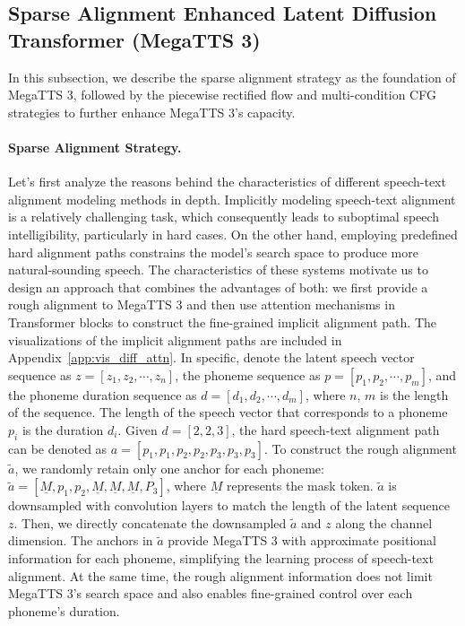 
\subsection{Sparse Alignment Enhanced Latent Diffusion Transformer (MegaTTS 3)}
\label{method:sec_3_2}
In this subsection, we describe the sparse alignment strategy as the foundation of MegaTTS 3, followed by the piecewise rectified flow and multi-condition CFG strategies to further enhance MegaTTS 3's capacity.

\paragraph{Sparse Alignment Strategy.}
Let’s first analyze the reasons behind the characteristics of different speech-text alignment modeling methods in depth. Implicitly modeling speech-text alignment is a relatively challenging task, which consequently leads to suboptimal speech intelligibility, particularly in hard cases. On the other hand, employing predefined hard alignment paths constrains the model's search space to produce more natural-sounding speech. The characteristics of these systems motivate us to design an approach that combines the advantages of both: we first provide a rough alignment to MegaTTS 3 and then use attention mechanisms in Transformer blocks to construct the fine-grained implicit alignment path. The visualizations of the implicit alignment paths are included in Appendix~\ref{app:vis_diff_attn}. In specific, denote the latent speech vector sequence as $z=[z_1, z_2, \cdots, z_n]$, the phoneme sequence as $p=[p_1, p_2, \cdots, p_m]$, and the phoneme duration sequence as $d=[d_1, d_2, \cdots, d_m]$, where $n$, $m$ is the length of the sequence. The length of the speech vector that corresponds to a phoneme $p_i$ is the duration $d_i$. Given $d=[2, 2, 3]$, the hard speech-text alignment path can be denoted as $a=[p_1, p_1, p_2, p_2, p_3, p_3, p_3]$. To construct the rough alignment $\tilde{a}$, we randomly retain only one anchor for each phoneme: $\tilde{a} = [\underline{M}, p_1, p_2, \underline{M}, \underline{M}, \underline{M}, P_3]$, where $\underline{M}$ represents the mask token. $\tilde{a}$ is downsampled with convolution layers to match the length of the latent sequence $z$. Then, we directly concatenate the downsampled $\tilde{a}$ and $z$ along the channel dimension. The anchors in $\tilde{a}$ provide MegaTTS 3 with approximate positional information for each phoneme, simplifying the learning process of speech-text alignment. At the same time, the rough alignment information does not limit MegaTTS 3's search space and also enables fine-grained control over each phoneme's duration.


